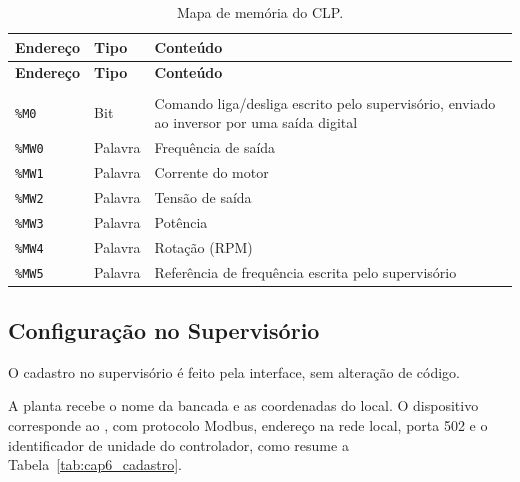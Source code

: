 {\renewcommand{\arraystretch}{1.3}\small
\begin{xltabular}{\textwidth}{>{\centering\arraybackslash}p{3.4cm}>{\centering\arraybackslash}p{2.2cm}>{\centering\arraybackslash}X}
        \caption{Mapa de memória do CLP.}
        \label{tab:cap6_memoria_clp}\\
        \hline
        \textbf{Endereço} & \textbf{Tipo} & \textbf{Conteúdo} \\
        \hline
        \endfirsthead
        \hline
        \textbf{Endereço} & \textbf{Tipo} & \textbf{Conteúdo} \\
        \hline
        \endhead
        \endfoot
         \\
        \endlastfoot
        \texttt{\%M0} & Bit & Comando liga/desliga escrito pelo supervisório, enviado ao inversor por uma saída digital \\
        \hline
        \texttt{\%MW0} & Palavra & Frequência de saída \\
        \hline
        \texttt{\%MW1} & Palavra & Corrente do motor \\
        \hline
        \texttt{\%MW2} & Palavra & Tensão de saída \\
        \hline
        \texttt{\%MW3} & Palavra & Potência \\
        \hline
        \texttt{\%MW4} & Palavra & Rotação (RPM) \\
        \hline
        \texttt{\%MW5} & Palavra & Referência de frequência escrita pelo supervisório \\
        \hline
\end{xltabular}}

\subsection{Configuração no Supervisório}

\par O cadastro no supervisório é feito pela interface, sem alteração de código.

\par A planta recebe o nome da bancada e as coordenadas do local. O dispositivo corresponde ao , com protocolo Modbus, endereço  na rede local, porta 502 e o identificador de unidade do controlador, como resume a Tabela~\ref{tab:cap6_cadastro}.

